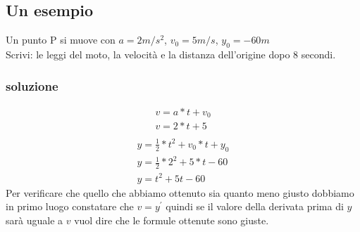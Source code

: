 \documentclass{book}
\begin{document}
\subsection{Un esempio}
Un punto P si muove con $a=2m/s^2$, $v_0=5m/s$, $y_0=-60m$\\
Scrivi: le leggi del moto, la velocità e la distanza dell'origine dopo 8
secondi.
\subsubsection{soluzione}
\begin{multicols}{2}
	\begin{equation}
	\begin{matrix}
			v=a*t+v_0\\
			v=2*t+5\\
	\end{matrix}
	\end{equation}
	\begin{equation}
	\begin{matrix}
			y=\frac{1}{2}*t^2+v_0*t+y_0\\
			y=\frac{1}{2}*2^2+5*t-60\\
			y=t^2+5t-60
	\end{matrix}
	\end{equation}
	Per verificare che quello che abbiamo ottenuto sia quanto meno giusto
	dobbiamo in primo luogo constatare che $v=y^\prime$ quindi se il valore
	della derivata prima di $y$ sarà uguale a $v$ vuol dire che le formule
	ottenute sono giuste.
\end{multicols}
\end{document}
